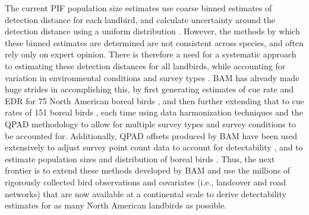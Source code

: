 \par The current PIF population size estimates use coarse binned estimates of detection distance for each landbird, and calculate uncertainty around the detection distance using a uniform distribution \citep{stanton_estimating_2019, will_handbook_2020}. However, the methods by which these binned estimates are determined are not consistent across species, and often rely only on expert opinion. There is therefore a need for a systematic approach to estimating these detection distances for all landbirds, while accounting for variation in environmental conditions and survey types \citep{stanton_estimating_2019, will_handbook_2020}. BAM has already made huge strides in accomplishing this, by first generating estimates of cue rate and EDR for 75 North American boreal birds \citep{solymos_calibrating_2013}, and then further extending that to cue rates of 151 boreal birds \citep{solymos_evaluating_2018}, each time using data harmonization techniques \citep{barker_ecological_2015} and the QPAD methodology \citep{solymos_calibrating_2013} to allow for multiple survey types and survey conditions to be accounted for. Additionally, QPAD offsets produced by BAM have been used extensively to adjust survey point count data to account for detectability \citep{hobson_long-term_2019, zlonis_burn_2019, knaggs_avian_2020, leston_quantifying_2020}, and to estimate population sizes and distribution of boreal birds \citep{crosby_differential_2019, solymos_lessons_2020}. Thus, the next frontier is to extend these methods developed by BAM and use the millions of rigorously collected bird observations and covariates (i.e., landcover and road networks) that are now available at a continental scale to derive detectability estimates for as many North American landbirds as possible.

